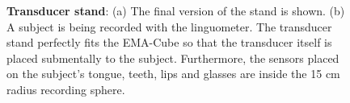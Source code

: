 \begin{figure}
	\centering
		\hspace{0.05\textwidth}

	\caption[Transducer stand]{\textbf{Transducer stand}:
	(a) The final version of the stand is shown.
	(b) A subject is being recorded with the linguometer. The transducer stand
	perfectly fits the EMA-Cube so that the transducer itself is placed
	submentally to the subject. Furthermore, the sensors placed on the
	subject's tongue, teeth, lips and glasses are inside the 15 cm radius 
	recording sphere.
	}
	\label{fig:linguometer:od:subject}
\end{figure}
